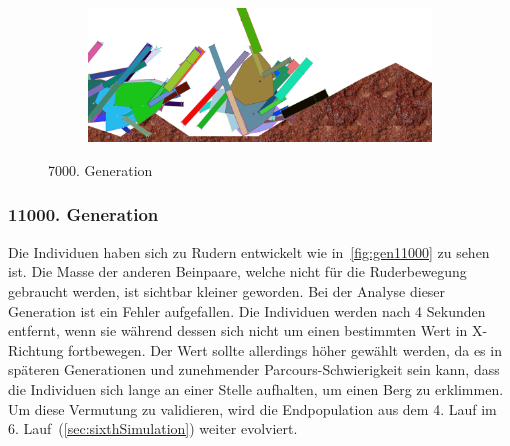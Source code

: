 \begin{figure}[H]
\begin{subfigure}[b]{0.45\textwidth}
            \includegraphics[width=\linewidth,center]{graphics/simulation-results/4_gen7000_4}
            \caption{\label{fig:gen7000_4}}
          \end{subfigure}
          \caption{7000. Generation\label{fig:gen7000}}
        \end{figure}

      \subsubsection{11000. Generation}

        Die Individuen haben sich zu Rudern entwickelt wie in~\vref{fig:gen11000} zu sehen ist.
        Die Masse der anderen Beinpaare, welche nicht für die Ruderbewegung gebraucht werden,
        ist sichtbar kleiner geworden.
        Bei der Analyse dieser Generation ist ein Fehler aufgefallen.
        Die Individuen werden nach 4 Sekunden entfernt,
        wenn sie während dessen sich nicht um einen bestimmten Wert in X-Richtung fortbewegen.
        Der Wert sollte allerdings höher gewählt werden,
        da es in späteren Generationen und zunehmender Parcours-Schwierigkeit sein kann,
        dass die Individuen sich lange an einer Stelle aufhalten, um einen Berg zu erklimmen.
        Um diese Vermutung zu validieren,
        wird die Endpopulation aus dem 4. Lauf im 6. Lauf~(\vref{sec:sixthSimulation}) weiter evolviert.


